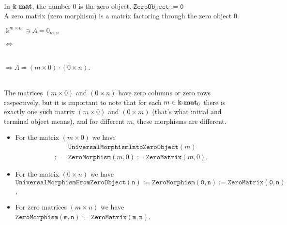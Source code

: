 \begin{example}\label{ex:kmat_pre-additive}
In $\Bbbk\textnormal{-}\mathbf{mat}$, the number $0$ is the zero object. $\mathtt{ZeroObject := 0}$\\
A zero matrix (zero morphism) is a matrix factoring through the zero object $0$.\\
\begin{minipage}{.2\textwidth}\phantom{ }\end{minipage}
\begin{minipage}{.25\textwidth}
$\Bbbk^{m\times n} \ni A = 0_{m,n}$
\end{minipage}
\begin{minipage}{.08\textwidth}
$\Longleftrightarrow$
\end{minipage}
\begin{minipage}{.32\textwidth}
\\
$\Rightarrow A = (m \times 0) \cdot (0 \times n)$.
\end{minipage}
\begin{minipage}{.15\textwidth}\phantom{ }\end{minipage}\\

\noindent The matrices $(m \times 0)$ and $(0 \times n)$ have zero columns or zero rows respectively, but it is
important to note that for each $m \in \Bbbk\textnormal{-}\mathbf{mat}_{0}$ there is exactly one such matrix $(m \times 0)$ and $(0 \times m)$
(that's what initial and terminal object means), and for different $m$, these morphisms are different.

\begin{itemize}
\item For the matrix $(m \times 0)$ we have
\begin{align*}
&\mathtt{UniversalMorphismIntoZeroObject}(m)\\
:=\, &\mathtt{ZeroMorphism}(m, 0) := \mathtt{ZeroMatrix}( m, 0 ),
\end{align*}
\item For the matrix $(0 \times n)$ we have\\
$\mathtt{UniversalMorphismFromZeroObject (n) := ZeroMorphism(0, n) := ZeroMatrix( 0, n )}$,
\item For zero matrices $(m \times n)$ we have $\mathtt{ZeroMorphism(m, n) := ZeroMatrix( m, n )}$.
\end{itemize}


\end{example}
